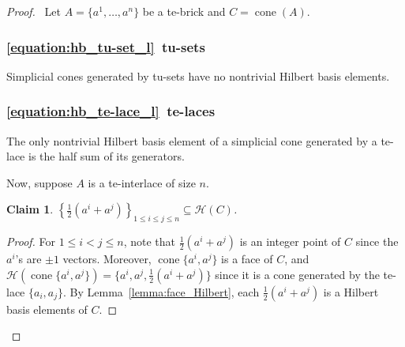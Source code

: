 \documentclass[11pt,a4paper]{amsart}
\renewcommand*{\leq}{\leqslant}
\theoremstyle{plain}
\newtheorem{claimnumb}{Claim}[theorem]{\itshape}{\rmfamily}
\theoremstyle{definition}
\newcommand{\cal}[1]{\mathcal{#1}}
\DeclareMathOperator{\cone}{cone}
\renewcommand{\cal}[1]{\mathcal{#1}}
\begin{document}
\begin{proof}~Let $A = \{a^1,\ldots,a^n\}$ be a te-brick and $C = \cone (A)$.
\subsubsection*{\ref{equation:hb_tu-set_l}~tu-sets}
Simplicial cones generated by tu-sets have no nontrivial Hilbert basis elements.
\subsubsection*{\ref{equation:hb_te-lace_l}~te-laces}
The only nontrivial Hilbert basis element of a simplicial cone generated by a te-lace is the half sum of its generators.

\medskip

Now, suppose $A$ is a te-interlace of size $n$.
\begin{claimnumb}\label{claim:0}
$\left\{\frac{1}{2} (a^i + a^j)\right\}_{1\leq i\leq j\leq n} \subseteq \cal H(C)$.
\end{claimnumb}
\begin{proof}
For $1\leq i<j\leq n$, note that $\frac{1}{2} (a^i + a^j)$ is an integer point of $C$ since the $a^i$'s are $\pm 1$ vectors.
Moreover, $\cone \{a^i,a^j\}$ is a face of $C$, and $\cal H\left(\cone \{a^i,a^j\}\right) = \{a^i,a^j,\frac{1}{2}(a^i+a^j)\}$ since it is a cone generated by the te-lace $\{a_i,a_j\}$.
By Lemma~\ref{lemma:face_Hilbert}, each $\frac{1}{2}(a^i+a^j)$ is a Hilbert basis elements of $C$.
\end{proof}



\end{proof}
\end{document}
